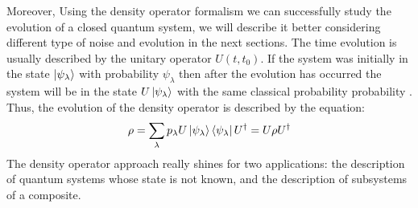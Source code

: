 Moreover, Using the density operator formalism we can successfully study the evolution of a closed quantum system, we will describe it better considering different type of noise and evolution in the next sections. The time evolution is usually described by the unitary operator $U(t,t_0)$. If the system was initially in the state $\ket{\psi_{\lambda}}$ with probability $\psi_{\lambda}$ then after the evolution has occurred the system will be in the state $U\ket{\psi_{\lambda}}$ with the same classical probability probability . Thus, the evolution of the density operator is described by the equation: 
\begin{equation}
    \rho = \sum_{\lambda} p_{\lambda} U\ket{\psi_{\lambda}}\bra{\psi_{\lambda}}U^{\dagger} = U\rho U^{\dagger}
\end{equation}
The density operator approach really shines for two applications: the description of quantum systems whose state is not known, and the description of subsystems of a composite. 

